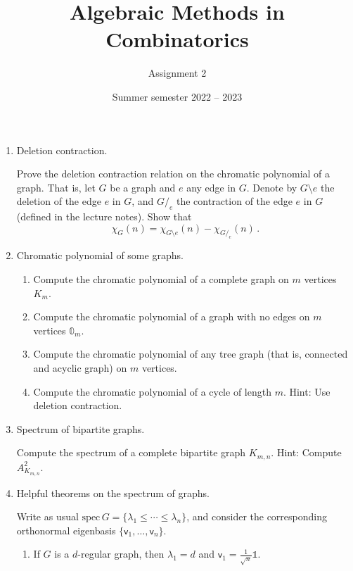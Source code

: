 \documentclass[kulak]{tplt}
\title{Algebraic Methods in Combinatorics}
\author{Assignment 2}
\date{Summer semester 2022 -- 2023}
\theoremstyle{definition}
\newcommand{\vv}{\mathsf{v}}
\newcommand{\spec}{\mathrm{spec}}
\begin{document}
\maketitle
\vspace{2mm}
\begin{enumerate}
\item Deletion contraction.

Prove the deletion contraction relation on the chromatic polynomial of a graph.
That is, let $G$ be a graph and $e$ any edge in $G$.
Denote by $G\setminus e $ the deletion of the edge $e$ in $G$, and $G /_e$ the contraction of the edge $e$ in $G$ (defined in the lecture notes).
Show that
$$ \chi_G(n) = \chi_{G\setminus e}(n) - \chi_{G /_e}(n)\, . $$

\item Chromatic polynomial of some graphs.

\begin{enumerate}
\item Compute the chromatic polynomial of a complete graph on $m$ vertices $K_m$.

\item Compute the chromatic polynomial of a graph with no edges on $m$ vertices $\mathbb{0}_m$.

\item Compute the chromatic polynomial of any tree graph (that is, connected and acyclic graph) on $m$ vertices.

\item Compute the chromatic polynomial of a cycle of length $m$.
Hint: Use deletion contraction.
\end{enumerate}



\item Spectrum of bipartite graphs.

Compute the spectrum of a complete bipartite graph $K_{m, n}$.
Hint: Compute $A_{K_{m, n}}^2$.



\item Helpful theorems on the spectrum of graphs.

Write as usual $\spec \, G = \{\lambda_1 \leq \cdots \leq \lambda_n \}$, and consider the corresponding orthonormal eigenbasis $\{\vv_1, \ldots, \vv_n\}$.


\begin{enumerate}
\item If $G$ is a $d$-regular graph, then $\lambda_1 = d$ and $\vv_1 = \frac{1}{\sqrt{n}}\mathbb{1}$.


\end{enumerate}
\end{enumerate}
\end{document}
